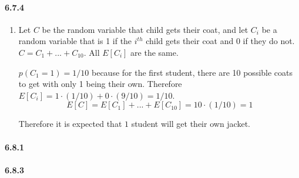 \documentclass[11pt, letterpaper, twocolumn, fleqn]{article}
\begin{document}
\paragraph{6.7.4}
\begin{enumerate}
  \item Let $C$ be the random variable that child gets their coat, and let $C_i$ be a random variable that is 1 if the $i^{th}$ child gets their coat and 0 if they do not. $C = C_1 + ... + C_{10}$. All $E[C_i]$ are the same. 
  
  $p(C_1 = 1) = 1/10$ because for the first student, there are 10 possible coats to get with only 1 being their own. Therefore $E[C_i] = 1 \cdot (1/10) + 0 \cdot (9 / 10) = 1/10$.
    $$E[C] = E[C_1] + ... + E[C_10] = 10 \cdot (1/10) = 1$$
    
  Therefore it is expected that $1$ student will get their own jacket.
\end{enumerate}

\paragraph{6.8.1}
\paragraph{6.8.3}
\end{document}

